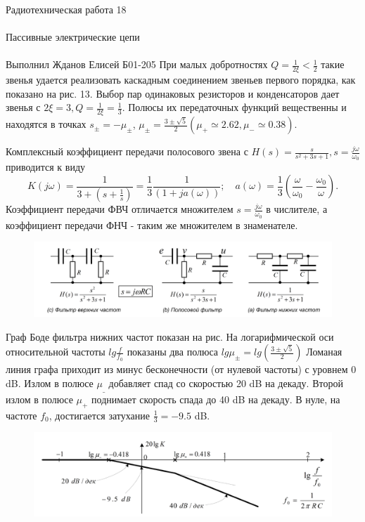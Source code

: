 \documentclass{astroedu-lab}
\begin{document}
\begin{problem}{\huge Радиотехническая работа 18\\\\Пассивные электрические цепи\\\\Выполнил Жданов Елисей Б01-205}
При малых добротностях $Q=\frac{1}{2 \xi}<\frac{1}{2}$ такие звенья удается реализовать каскадным соединением звеньев первого порядка, как показано на рис. 13. Выбор пар одинаковых резисторов и конденсаторов дает звенья с $2 \xi=3, Q=\frac{1}{2 \xi}=\frac{1}{3}$. Полюсы их передаточных функций вещественны и находятся в точках $s_{ \pm}=-\mu_{ \pm}$, $\mu_{ \pm}=\frac{3 \pm \sqrt{5}}{2}\left(\mu_{+} \simeq 2.62, \mu_{-} \simeq 0.38\right)$.

Комплексный коэффициент передачи полосового звена с $H(s)=\frac{s}{s^2+3 s+1}, s=\frac{j \omega}{\omega_0}$ приводится к виду
$$
K(j \omega)=\frac{1}{3+\left(s+\frac{1}{s}\right)}=\frac{1}{3} \frac{1}{(1+j a(\omega))} ; \quad a(\omega)=\frac{1}{3}\left(\frac{\omega}{\omega_0}-\frac{\omega_0}{\omega}\right) .
$$
Коэффициент передачи ФВЧ отличается множителем $s=\frac{j \omega}{\omega_0}$ в числителе, а коэффициент передачи ФНЧ - таким же множителем в знаменателе.

\begin{figure}[!h]
	\centering
	\includegraphics[width=1\textwidth]{2_1.png}
	\label{fig:boiler}
\end{figure}

Граф Боде фильтра нижних частот показан на рис. На
логарифмической оси относительной частоты $lg \frac{f}{f_0}$ показаны два полюса $lg \mu_{\pm} = lg \left( \frac{3 \pm \sqrt{5}}{2} \right)$ Ломаная линия графа приходит из минус бесконечности (от нулевой частоты) с уровнем 0 dB. Излом в полюсе $\mu_{\_}$ добавляет спад со скоростью 20 dB на
декаду. Второй излом в полюсе $\mu_{+}$ поднимает скорость спада до
40 dB на декаду. В нуле, на частоте $f_0$, достигается затухание $\frac{1}{3} = -9.5$ dB.

\begin{figure}[!h]
	\centering
	\includegraphics[width=1\textwidth]{2_2.png}
	\label{fig:boiler}
\end{figure}


\end{problem}
\end{document}
